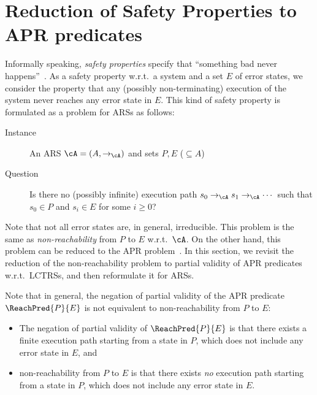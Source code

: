 \section{Reduction of Safety Properties to APR predicates}
\label{sec:reduction-of-safety-properties-to-APR}

Informally speaking, \emph{safety properties} specify that ``something bad never happens''~\cite[Section~3.3.2]{BK08}.
As a safety property w.r.t.\ a system and a set $E$ of error states, we consider the property that
any (possibly non-terminating) execution of the system never reaches any error state in $E$.
This kind of safety property is formulated as a problem for ARSs as follows:
\begin{description}
	\item[Instance] An ARS $\cA=(A,\to_\cA)$ and sets $P,E$ ($\subseteq A$)
	\item[Question] Is there no (possibly infinite) execution path $s_0 \to_\cA s_1 \to_\cA \cdots$ such that $s_0 \in P$ and
	      $s_i \in E$ for some $i \geq 0$?
\end{description}
Note that not all error states are, in general, irreducible.
This problem is the same as \emph{non-reachability} from $P$ to $E$ w.r.t.\ $\cA$.
On the other hand, this problem can be reduced to the APR problem~\cite{KN23jlamp}.
In this section, we revisit the reduction
of the non-reachability problem
to partial validity of APR predicates w.r.t.\ LCTRSs, and then reformulate it for ARSs.

Note that in general, the negation of partial validity of the APR predicate $\ReachPred{P}{E}$ is not equivalent to non-reachability from $P$ to $E$:
\begin{itemize}
	\item The negation of partial validity of $\ReachPred{P}{E}$ is that
	      there exists a finite execution path starting from a state in $P$, which does not include any error state in $E$, and
	\item non-reachability from $P$ to $E$ is that
	      there exists \emph{no} execution path starting from a state in $P$, which does not include any error state in $E$.
\end{itemize}

